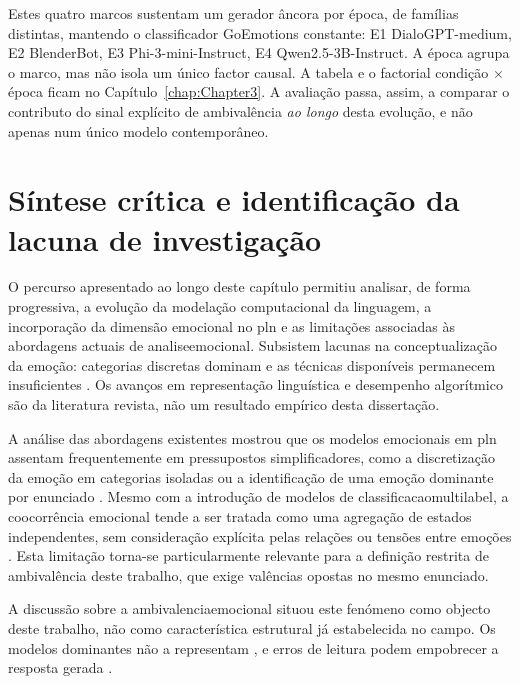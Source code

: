 Estes quatro marcos sustentam um gerador âncora por época, de famílias distintas, mantendo o classificador GoEmotions constante: E1 DialoGPT-medium, E2 BlenderBot, E3 Phi-3-mini-Instruct, E4 Qwen2.5-3B-Instruct. A época agrupa o marco, mas não isola um único factor causal. A tabela e o factorial condição \(\times\) época ficam no Capítulo~\ref{chap:Chapter3}. A avaliação passa, assim, a comparar o contributo do sinal explícito de ambivalência \textit{ao longo} desta evolução, e não apenas num único modelo contemporâneo.


\section{Síntese crítica e identificação da lacuna de investigação}
\label{sec:sintese}

O percurso apresentado ao longo deste capítulo permitiu analisar, de forma progressiva, a evolução da modelação computacional da linguagem, a incorporação da dimensão emocional no \gls{pln} e as limitações associadas às abordagens actuais de \gls{analiseemocional}. Subsistem lacunas na conceptualização da emoção: categorias discretas dominam e as técnicas disponíveis permanecem insuficientes \parencite{PlazaDelArco2024Trends, Seyeditabari2018Review}. Os avanços em representação linguística e desempenho algorítmico são da literatura revista, não um resultado empírico desta dissertação.

A análise das abordagens existentes mostrou que os modelos emocionais em \gls{pln} assentam frequentemente em pressupostos simplificadores, como a discretização da emoção em categorias isoladas ou a identificação de uma emoção dominante por enunciado \parencite{PlazaDelArco2024Trends, Seyeditabari2018Review}. Mesmo com a introdução de modelos de \gls{classificacaomultilabel}, a coocorrência emocional tende a ser tratada como uma agregação de estados independentes, sem consideração explícita pelas relações ou tensões entre emoções \parencite{Singh2026MultiEmotionIntensity, Zhao2026MEGE}. Esta limitação torna-se particularmente relevante para a definição restrita de ambivalência deste trabalho, que exige valências opostas no mesmo enunciado.

A discussão sobre a \gls{ambivalenciaemocional} situou este fenómeno como objecto deste trabalho, não como característica estrutural já estabelecida no campo. Os modelos dominantes não a representam \parencite{PlazaDelArco2024Trends, Singh2026MultiEmotionIntensity, Zhao2026MEGE}, e erros de leitura podem empobrecer a resposta gerada \parencite{Huangfu2025NEC}.

